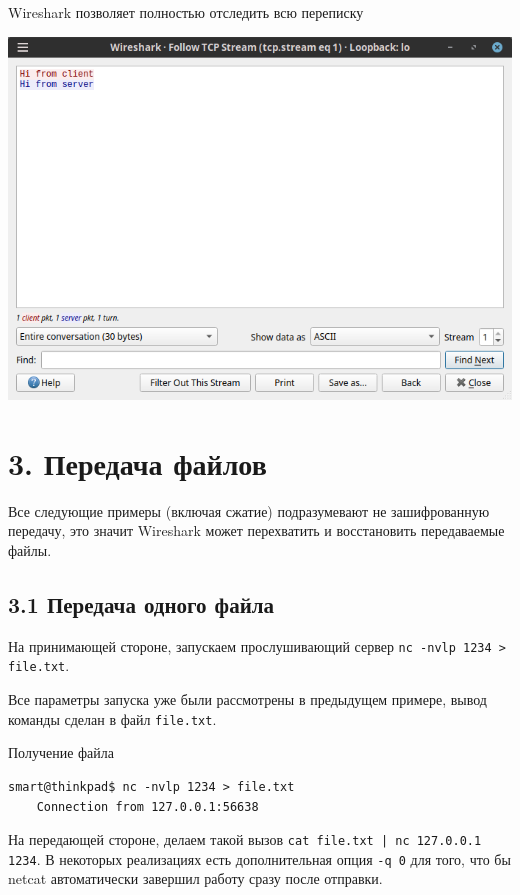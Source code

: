 \newpage

Wireshark позволяет полностью отследить всю переписку
\begin{center}
    \includegraphics[scale=0.55]{res/7.wireshark-nc-follow.png}
\end{center}

\section*{3. Передача файлов}

Все следующие примеры (включая сжатие) подразумевают не зашифрованную передачу, это значит Wireshark может перехватить и восстановить передаваемые файлы.

\subsection*{3.1 Передача одного файла}

На принимающей стороне, запускаем прослушивающий сервер \texttt{nc -nvlp 1234 > file.txt}.

Все параметры запуска уже были рассмотрены в предыдущем примере, вывод команды сделан в файл \texttt{file.txt}.

Получение файла
\begin{Verbatim}[frame=single,breaklines=true,breakanywhere=true]
    smart@thinkpad$ nc -nvlp 1234 > file.txt
    Connection from 127.0.0.1:56638
\end{Verbatim}

На передающей стороне, делаем такой вызов \texttt{cat file.txt | nc 127.0.0.1 1234}. В некоторых реализациях есть дополнительная опция \texttt{-q 0} для того, что бы netcat автоматически завершил работу сразу после отправки.

